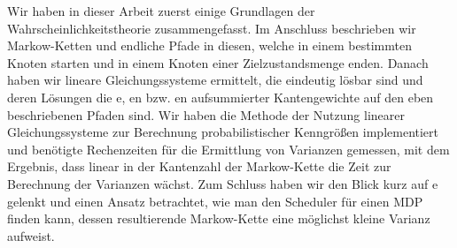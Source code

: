 \documentclass[a4paper]{article}
\newcommand{\mc}{Markow-Kette}
\theoremstyle{nonumberplain}
\begin{document}
	Wir haben in dieser Arbeit zuerst einige Grundlagen der Wahrscheinlichkeitstheorie zusammengefasst. Im Anschluss beschrieben wir \mc{}n und endliche Pfade in diesen, welche in einem bestimmten Knoten starten und in einem Knoten einer Zielzustandsmenge enden. Danach haben wir lineare Gleichungssysteme ermittelt, die eindeutig lösbar sind und deren Lösungen die \expect{}e, \var{}en bzw. \cov{}en aufsummierter Kantengewichte auf den eben beschriebenen Pfaden sind.
	Wir haben die Methode der Nutzung linearer Gleichungssysteme zur Berechnung probabilistischer Kenngrößen implementiert und benötigte Rechenzeiten für die Ermittlung von Varianzen gemessen, mit dem Ergebnis, dass linear in der Kantenzahl der \mc{} die Zeit zur Berechnung der Varianzen wächst. Zum Schluss haben wir den Blick kurz auf \mdp{}e gelenkt und einen Ansatz betrachtet, wie man den Scheduler für einen MDP finden kann, dessen resultierende \mc{} eine möglichst kleine Varianz aufweist.
	
\end{document}

